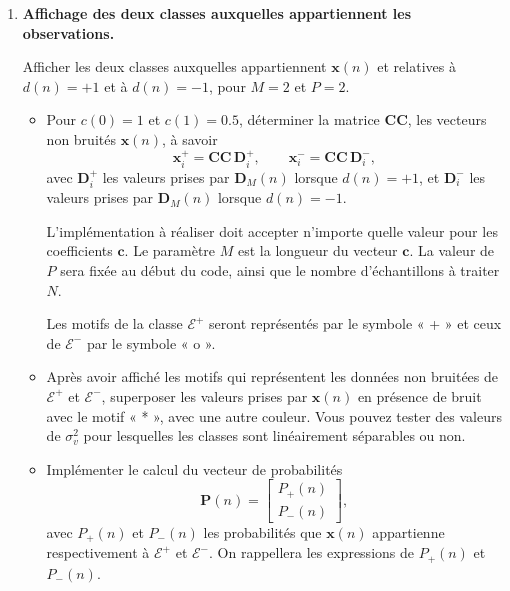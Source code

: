 \documentclass[11pt,a4paper]{article}
\newcommand{\CC}{\mathbf{CC}}
\newcommand{\D}{\mathbf{D}}
\newcommand{\xv}{\mathbf{x}}
\newcommand{\cv}{\mathbf{c}}
\begin{document}
\begin{enumerate}[label=\arabic*.]

\item \textbf{Affichage des deux classes auxquelles appartiennent les observations.}

Afficher les deux classes auxquelles appartiennent $\xv(n)$ et relatives à
$d(n)=+1$ et à $d(n)=-1$, pour $M=2$ et $P=2$.

\begin{itemize}
    \item Pour $c(0)=1$ et $c(1)=0.5$, déterminer la matrice $\CC$,
    les vecteurs non bruités $\xv(n)$, à savoir
    \[
        \xv_i^{+}=\CC\,\D_i^{+},
        \qquad
        \xv_i^{-}=\CC\,\D_i^{-},
    \]
    avec $\D_i^{+}$ les valeurs prises par $\D_M(n)$ lorsque $d(n)=+1$,
    et $\D_i^{-}$ les valeurs prises par $\D_M(n)$ lorsque $d(n)=-1$.

    L'implémentation à réaliser doit accepter n'importe quelle valeur pour
    les coefficients $\cv$. Le paramètre $M$ est la longueur du vecteur
    $\cv$. La valeur de $P$ sera fixée au début du code, ainsi que le nombre
    d'échantillons à traiter $N$.

    Les motifs de la classe $\mathcal{E}^{+}$ seront représentés par
    le symbole « + » et ceux de $\mathcal{E}^{-}$ par le symbole « o ».

    \item Après avoir affiché les motifs qui représentent les données
    non bruitées de $\mathcal{E}^{+}$ et $\mathcal{E}^{-}$, superposer
    les valeurs prises par $\xv(n)$ en présence de bruit avec le motif
    « * », avec une autre couleur. Vous pouvez tester des valeurs de
    $\sigma_v^2$ pour lesquelles les classes sont linéairement séparables
    ou non.

    \item Implémenter le calcul du vecteur de probabilités
    \[
        \mathbf{P}(n)=
        \begin{bmatrix}
            P_{+}(n)\\
            P_{-}(n)
        \end{bmatrix},
    \]
    avec $P_{+}(n)$ et $P_{-}(n)$ les probabilités que $\xv(n)$
    appartienne respectivement à $\mathcal{E}^{+}$ et $\mathcal{E}^{-}$.
    On rappellera les expressions de $P_{+}(n)$ et $P_{-}(n)$.


\end{itemize}
\end{enumerate}
\end{document}
